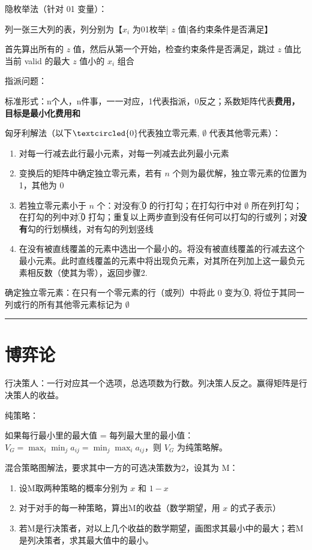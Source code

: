 \documentclass[UTF8, 6pt]{ctexart}
\newcommand{\mcompress}{\vspace{-10 px}}
\newcommand{\sectionline}{\rule[2pt]{0.45\textwidth}{0.05em}}
\begin{document}
隐枚举法（针对 01 变量）：

列一张三大列的表，列分别为【$x_i$ 为01枚举| $z$ 值|各约束条件是否满足】

首先算出所有的 $z$ 值，然后从第一个开始，检查约束条件是否满足，跳过 $z$ 值比当前 valid 的最大 $z$ 值小的 $x_i$ 组合

指派问题：

\noindent
标准形式：n个人，n件事，一一对应，1代表指派，0反之；系数矩阵代表\textbf{费用，目标是最小化费用和}

匈牙利解法（以下$\textcircled{0}$代表独立零元素, $\emptyset$ 代表其他零元素）：

\begin{enumerate}
	\item 对每一行减去此行最小元素，对每一列减去此列最小元素
	\item 变换后的矩阵中确定独立零元素，若有 $n$ 个则为最优解，独立零元素的位置为 1，其他为 0
	\item 若独立零元素小于 $n$ 个：对没有 \textcircled{0} 的行打勾；在打勾行中对 $\emptyset$ 所在列打勾；在打勾的列中对 \textcircled{0} 打勾；重复以上两步直到没有任何可以打勾的行或列；对\textbf{没有}勾的行划横线，对有勾的列划竖线
	\item 在没有被直线覆盖的元素中选出一个最小的。将没有被直线覆盖的行减去这个最小元素。此时直线覆盖的元素中将出现负元素，对其所在列加上这一最负元素相反数（使其为零），返回步骤2.
\end{enumerate}

确定独立零元素：在只有一个零元素的行（或列）中将此 0 变为 \textcircled{0}, 将位于其同一列或行的所有其他零元素标记为 $\emptyset$

\sectionline
\mcompress\mcompress
\section{博弈论}


行决策人：一行对应其一个选项，总选项数为行数。列决策人反之。赢得矩阵是行决策人的收益。

纯策略：

如果每行最小里的最大值 = 每列最大里的最小值：$V_{G}=\max _{i} \min _{j} a_{i j}=\min _{j} \max _{i} a_{i j}$，则 $V_{G}$ 为纯策略解。

混合策略图解法，要求其中一方的可选决策数为2，设其为 M：

\begin{enumerate}
	\item 设M取两种策略的概率分别为 $x$ 和 $1-x$
	\item 对于对手的每一种策略，算出M的收益（数学期望，用 $x$ 的式子表示）
	\item 若M是行决策者，对以上几个收益的数学期望，画图求其最小中的最大；若M是列决策者，求其最大值中的最小。
\end{enumerate}
\end{document}
